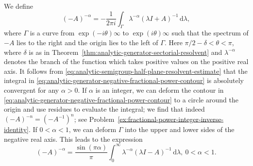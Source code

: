 We define
\begin{equation}\label{eq:analytic-generator-negative-fractional-power-contour}
(-A)^{-\alpha}=-\dfrac{1}{2\pi i}\int_\Gamma\lambda^{-\alpha}(\lambda I+A)^{-1}\,\mathrm{d}\lambda,
\end{equation}
where $\Gamma$ is a curve from $\exp(-i\theta)\infty$ to $\exp(i\theta)\infty$ such that the spectrum of $-A$ lies to the right and the origin lies to the left of $\Gamma$. Here $\pi/2-\delta<\theta<\pi$, where $\delta$ is as in Theorem~\ref{thm:analytic-generator-sectorial-resolvent} and $\lambda^{-\alpha}$ denotes the branch of the function which takes positive values on the positive real axis. It follows from \eqref{eq:analytic-semigroup-half-plane-resolvent-estimate} that the integral in \eqref{eq:analytic-generator-negative-fractional-power-contour} is absolutely convergent for any $\alpha>0$. If $\alpha$ is an integer, we can deform the contour in \eqref{eq:analytic-generator-negative-fractional-power-contour} to a circle around the origin and use residues to evaluate the integral; we find that indeed $(-A)^{-n}=(-A^{-1})^n$; see Problem~\ref{ex:fractional-power-integer-inverse-identity}. If $0<\alpha<1$, we can deform $\Gamma$ into the upper and lower sides of the negative real axis. This leads to the expression
\begin{equation}\label{eq:analytic-generator-negative-fractional-power-real-resolvent}
(-A)^{-\alpha}=\dfrac{\sin(\pi\alpha)}{\pi}\int_0^\infty\lambda^{-\alpha}(\lambda I-A)^{-1}\,\mathrm{d}\lambda,\ 0<\alpha<1.
\end{equation}


